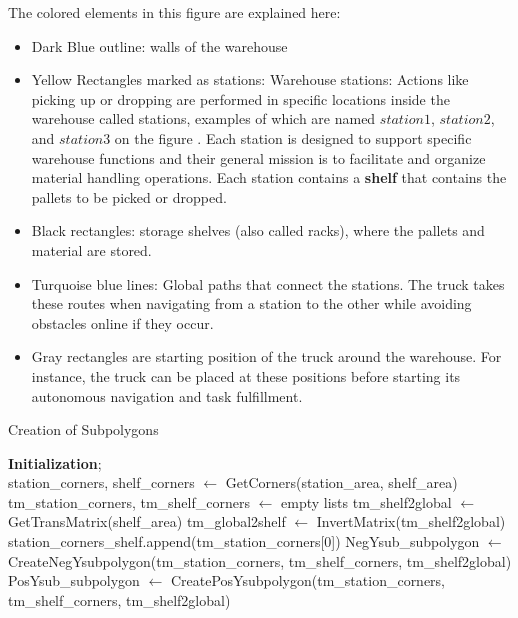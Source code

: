 The colored elements in this figure are explained here:
\begin{itemize}
    \item Dark Blue outline: walls of the warehouse
    \item Yellow Rectangles marked as stations: Warehouse stations: Actions like picking up or 
    dropping are performed in specific locations inside the warehouse called 
    stations, examples of which are named \(station1\), \(station2\), and \(station3\) on the figure .
    Each station is designed to support specific warehouse functions and their general mission
    is to facilitate and organize material handling operations. 
    Each station contains a \textbf{shelf} that contains the pallets to be picked or dropped. 
    \item Black rectangles: storage shelves (also called racks), where the  pallets and material are 
    stored. 
    \item Turquoise blue lines: Global paths that connect the stations.
    The truck takes these routes when navigating from a station to the other while avoiding 
    obstacles online if they occur.
    \item Gray rectangles are starting position of the truck around the warehouse. For instance,
    the truck can be placed at these positions before starting its autonomous navigation and 
    task fulfillment.

\end{itemize}



\noindent

\begin{algorithm}[H]
\caption{Creation of Subpolygons}\label{alg:createSubpolygons}
\BlankLine
\textbf{Initialization}; \\
station\_corners, shelf\_corners $\gets$ GetCorners(station\_area, shelf\_area)\;
tm\_station\_corners, tm\_shelf\_corners $\gets$ empty lists\;
tm\_shelf2global $\gets$ GetTransMatrix(shelf\_area)\;
tm\_global2shelf $\gets$ InvertMatrix(tm\_shelf2global)\;
station\_corners\_shelf.append(tm\_station\_corners[0])\;
NegYsub\_subpolygon $\gets$ CreateNegYsubpolygon(tm\_station\_corners, tm\_shelf\_corners, tm\_shelf2global)\;
PosYsub\_subpolygon $\gets$ CreatePosYsubpolygon(tm\_station\_corners, tm\_shelf\_corners, tm\_shelf2global)\;
\;
\end{algorithm}
\noindent



